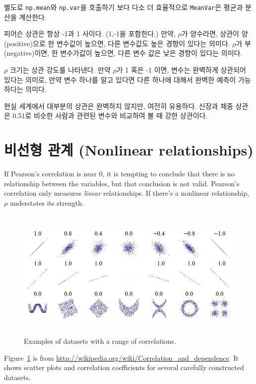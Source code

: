 별도로 {\tt np.mean}와 {\tt np.var}을 호출하기 보다 다소 더 효율적으로 {\tt MeanVar}은 평균과 분산을 계산한다.

피어슨 상관은 항상 -1과 1 사이다. (1,-1을 포함한다.) 만약, $\rho$가 양수라면, 상관이 양(positive)으로 한 변수값이 높으면, 다른 변수값도 높은 경향이 있다는 의미다. $\rho$가 부(negative)이면, 한 변수가값이 높으면, 다른 변수 값은 낮은 경향이 있다는 의미다.

$\rho$ 크기는 상관 강도를 나타낸다. 만약 $\rho$가 1 혹은 -1 이면, 변수는 완벽하게 상관되어 있다는 의미로, 만약 변수 하나를 알고 있다면 다른 하나에 대해서 완벽한 예측이 가능하다는 의미다.

현실 세계에서 대부분의 상관은 완벽하지 않지만, 여전히 유용하다.
신장과 체중 상관은 0.51로 비슷한 사람과 관련된 변수와 비교하여 볼 때 강한 상관이다.

\section{비선형 관계 (Nonlinear relationships)}

If Pearson's correlation is near 0, it is tempting to conclude
that there is no relationship between the variables, but that
conclusion is not valid.  Pearson's correlation only measures {\em
  linear} relationships.  If there's a nonlinear relationship, $\rho$
understates its strength.  

\begin{figure}
\centerline{\includegraphics[height=2.5in]{figs/Correlation_examples.png}}
\caption{Examples of datasets with a range of correlations.}
\label{corr_examples}
\end{figure}

Figure~\ref{corr_examples} is from
\url{http://wikipedia.org/wiki/Correlation_and_dependence}.  It shows
scatter plots and correlation coefficients for several
carefully constructed datasets.

